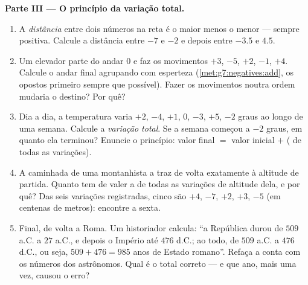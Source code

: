 \begin{problem}
\medskip
\noindent\textbf{Parte III --- O princípio da variação total.}
\begin{enumerate}[resume]
  \item A \emph{distância} entre dois números na reta é o maior menos o
        menor --- sempre positiva. Calcule a distância entre $-7$ e
        $-2$ e depois entre $-3.5$ e $4.5$.
  \item Um elevador parte do andar $0$ e faz os movimentos $+3$, $-5$,
        $+2$, $-1$, $+4$. Calcule o andar final agrupando com esperteza
        (\cref{met:g7:negatives:add}, os opostos primeiro sempre que
        possível). Fazer os movimentos noutra ordem mudaria o destino?
        Por quê?
  \item Dia a dia, a temperatura varia $+2$, $-4$, $+1$, $0$, $-3$,
        $+5$, $-2$ graus ao longo de uma semana. Calcule a
        \emph{variação total}. Se a semana começou a $-2$ graus, em
        quanto ela terminou? Enuncie o princípio: valor final $=$ valor
        inicial $+$ ( de todas as variações).
  \item A caminhada de uma montanhista a traz de volta exatamente à
        altitude de partida. Quanto tem de valer a  de todas as
        variações de altitude dela, e por quê? Das seis variações
        registradas, cinco são $+4$, $-7$, $+2$, $+3$, $-5$ (em
        centenas de metros): encontre a sexta.
  \item Final, de volta a Roma. Um historiador calcula: ``a República
        durou de $509$ a.C. a $27$ a.C., e depois o Império até
        $476$ d.C.; ao todo, de $509$ a.C. a $476$ d.C., ou seja,
        $509 + 476 = 985$ anos de Estado romano''. Refaça a conta com
        os números dos astrônomos. Qual é o total correto --- e que
        ano, mais uma vez, causou o erro?
\end{enumerate}
\end{problem}
